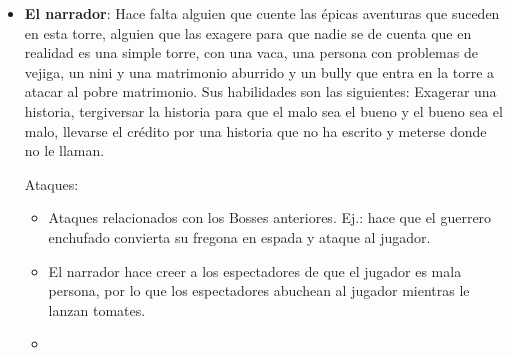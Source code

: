 \begin{itemize}
    \item \textbf{El narrador}: Hace falta alguien que cuente las épicas aventuras que suceden en esta torre, alguien que las exagere para que nadie se de cuenta que en realidad es una simple torre, con una vaca, una persona con problemas de vejiga, un nini y una matrimonio aburrido y un bully que entra en la torre a atacar al pobre matrimonio. Sus habilidades son las siguientes: Exagerar una historia, tergiversar la historia para que el malo sea el bueno y el bueno sea el malo, llevarse el crédito por una historia que no ha escrito y meterse donde no le llaman.
    
    Ataques:
    \begin{itemize}
        \item Ataques relacionados con los Bosses anteriores. Ej.: hace que el guerrero enchufado convierta su fregona en espada y ataque al jugador.
        \item El narrador hace creer a los espectadores de que el jugador es mala persona, por lo que los espectadores abuchean al jugador mientras le lanzan tomates.
        \item 
    \end{itemize}
\end{itemize}
